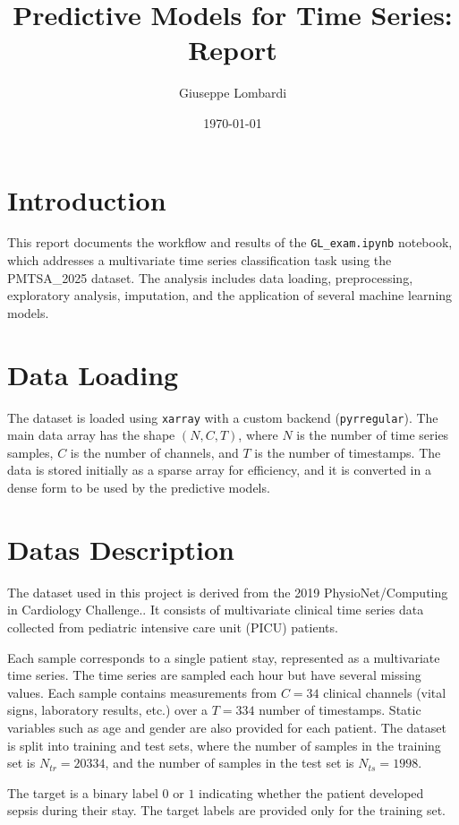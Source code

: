 \documentclass[a4paper,11pt]{article}
\title{Predictive Models for Time Series: Report}
\author{Giuseppe Lombardi}
\date{\today}
\begin{document}
\maketitle

\section{Introduction}
This report documents the workflow and results of the \texttt{GL\_exam.ipynb} notebook,
which addresses a multivariate time series classification task using the PMTSA\_2025 dataset.
The analysis includes data loading, preprocessing, exploratory analysis, imputation, and the application of several machine learning models.

\section{Data Loading}
The dataset is loaded using \texttt{xarray} with a custom backend (\texttt{pyrregular}).
The main data array has the shape $(N, C, T)$, where $N$ is the number of time series samples, $C$ is the number of channels, and $T$ is the number of timestamps.
The data is stored initially as a sparse array for efficiency, and it is converted in a dense form to be used by the predictive models.

\section{Datas Description}

The dataset used in this project is derived from the 2019 PhysioNet/Computing in Cardiology Challenge..
It consists of multivariate clinical time series data collected from pediatric intensive care unit (PICU) patients.

Each sample corresponds to a single patient stay, represented as a multivariate time series.
The time series are sampled each hour but have several missing values.
Each sample contains measurements from $C=34$ clinical channels (vital signs, laboratory results, etc.) over a $T=334$ number of timestamps.
Static variables such as age and gender are also provided for each patient.
The dataset is split into training and test sets, where the number of samples in the training set is $N_{tr}=20334$,
and the number of samples in the test set is $N_{ts}=1998$.

The target is a binary label $0$ or $1$ indicating whether the patient developed sepsis during their stay.
The target labels are provided only for the training set.
\end{document}

